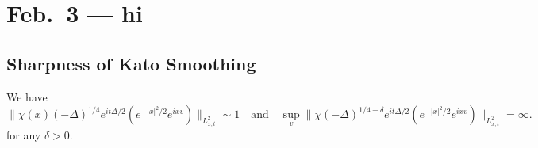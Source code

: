 \chapter{Feb.~3 --- hi}

\section{Sharpness of Kato Smoothing}

\begin{lemma}
  We have
  \[
    \|\chi(x) (-\Delta)^{1 / 4} e^{i t \Delta / 2} (e^{-|x|^2 / 2} e^{ixv})\|_{L^2_{x, t}} \sim 1
    \quad \text{and} \quad
    \sup_{v} \| \chi (-\Delta)^{1 / 4 + \delta} e^{it\Delta / 2} (e^{-|x|^2 / 2} e^{ixv}) \|_{L^2_{x, t}} = \infty.
  \]
  for any $\delta > 0$.
\end{lemma}

